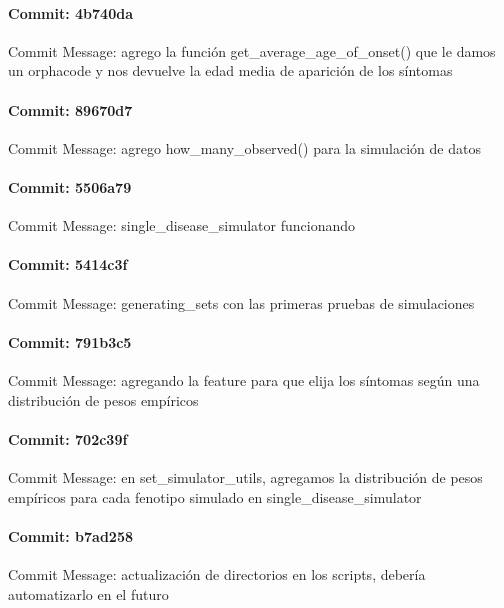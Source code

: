 \documentclass{article}
\begin{document}
\paragraph{Commit: 4b740da}
Commit Message: agrego la función get_average_age_of_onset() que le damos un orphacode y nos devuelve la edad media de aparición de los síntomas

\paragraph{Commit: 89670d7}
Commit Message: agrego how_many_observed() para la simulación de datos

\paragraph{Commit: 5506a79}
Commit Message: single_disease_simulator funcionando

\paragraph{Commit: 5414c3f}
Commit Message: generating_sets con las primeras pruebas de simulaciones

\paragraph{Commit: 791b3c5}
Commit Message: agregando la feature para que elija los síntomas según una distribución de pesos empíricos

\paragraph{Commit: 702c39f}
Commit Message: en set_simulator_utils, agregamos la distribución de pesos empíricos para cada fenotipo simulado en single_disease_simulator

\paragraph{Commit: b7ad258}
Commit Message: actualización de directorios en los scripts, debería automatizarlo en el futuro

\end{document}
